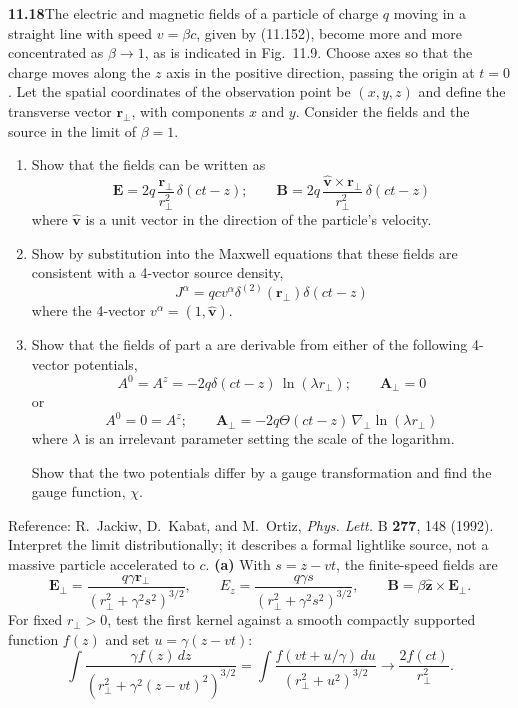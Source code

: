 \par\bigskip
\noindent\textbf{11.18}\quad The electric and magnetic fields of a particle of charge $q$ moving in a straight line with speed $v=\beta c$, given by (11.152), become more and more concentrated as $\beta\to1$, as is indicated in Fig.~11.9. Choose axes so that the charge moves along the $z$ axis in the positive direction, passing the origin at $t=0$. Let the spatial coordinates of the observation point be $(x,y,z)$ and define the transverse vector $\mathbf{r}_{\perp}$, with components $x$ and $y$. Consider the fields and the source in the limit of $\beta=1$.
\begin{enumerate}
\item[(a)] Show that the fields can be written as
\[
\mathbf{E}=2q\,\frac{\mathbf{r}_{\perp}}{r_{\perp}^{2}}\,\delta(ct-z);\qquad
\mathbf{B}=2q\,\frac{\hat{\mathbf{v}}\times\mathbf{r}_{\perp}}{r_{\perp}^{2}}\,\delta(ct-z)
\]
where $\hat{\mathbf{v}}$ is a unit vector in the direction of the particle's velocity.
\item[(b)] Show by substitution into the Maxwell equations that these fields are consistent with a 4-vector source density,
\[
J^{\alpha}=qcv^{\alpha}\delta^{(2)}(\mathbf{r}_{\perp})\delta(ct-z)
\]
where the 4-vector $v^{\alpha}=(1,\hat{\mathbf{v}})$.
\item[(c)] Show that the fields of part a are derivable from either of the following 4-vector potentials,
\[
A^{0}=A^{z}=-2q\delta(ct-z)\,\ln(\lambda r_{\perp});\qquad\mathbf{A}_{\perp}=0
\]
or
\[
A^{0}=0=A^{z};\qquad\mathbf{A}_{\perp}=-2q\Theta(ct-z)\,\nabla_{\perp}\ln(\lambda r_{\perp})
\]
where $\lambda$ is an irrelevant parameter setting the scale of the logarithm.

Show that the two potentials differ by a gauge transformation and find the gauge function, $\chi$.
\end{enumerate}
Reference: R.~Jackiw, D.~Kabat, and M.~Ortiz, \emph{Phys. Lett.} B \textbf{277}, 148 (1992).
\solution
Interpret the limit distributionally; it describes a formal
lightlike source, not a massive particle accelerated to $c$.
\textbf{(a)} With $s=z-vt$, the finite-speed fields are
\[
\mathbf E_\perp=\frac{q\gamma\mathbf r_\perp}
{(r_\perp^2+\gamma^2s^2)^{3/2}},\qquad
E_z=\frac{q\gamma s}{(r_\perp^2+\gamma^2s^2)^{3/2}},\qquad
\mathbf B=\beta\hat{\mathbf z}\times\mathbf E_\perp.
\]
For fixed $r_\perp>0$, test the first kernel against a smooth
compactly supported function $f(z)$ and set $u=\gamma(z-vt)$:
\[
\int\frac{\gamma f(z)\,dz}{(r_\perp^2+\gamma^2(z-vt)^2)^{3/2}}
=\int\frac{f(vt+u/\gamma)\,du}{(r_\perp^2+u^2)^{3/2}}
\longrightarrow \frac{2f(ct)}{r_\perp^2}.
\]
